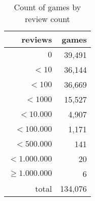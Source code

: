 \begin{table}[h]
    \centering
    \begin{tabular}{r|r}
reviews & games \\\hline
    $0$ & 39,491\\
    $< 10$  & 36,144\\
    $< 100$ & 36,669 \\
    $< 1000$ & 15,527\\
    $< 10.000$ & 4,907 \\
    $< 100.000$ & 1,171\\
    $< 500.000$ & 141 \\
    $< 1.000.000$ & 20\\
    $\geq1.000.000$ & 6\\\hline
    total &  134,076
\end{tabular}
    \caption{Count of games by review count}
    \label{tab:game_metrics}
\end{table}